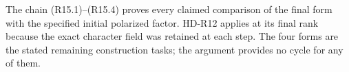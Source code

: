 The chain (R15.1)--(R15.4) proves every claimed comparison
of the final form with the specified initial polarized
factor. HD-R12 applies at its final rank because the exact
character field was retained at each step. The four forms
are the stated remaining construction tasks; the argument
provides no cycle for any of them.

